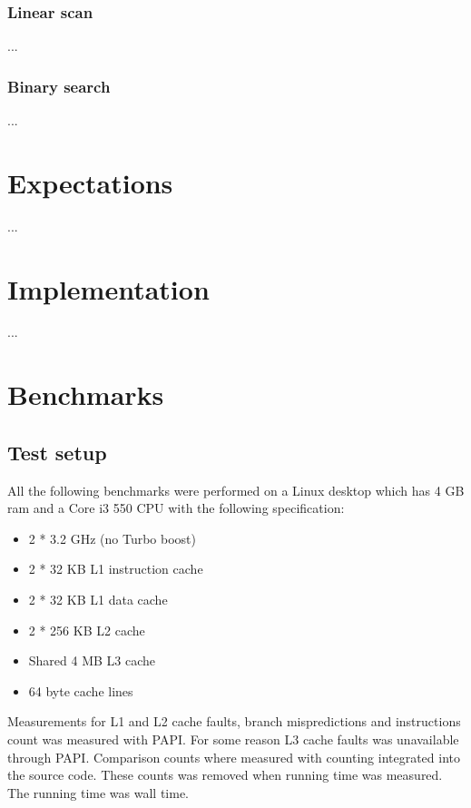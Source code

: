 \documentclass[a4paper]{article}
\begin{document}
\subsubsection{Linear scan}

...

\subsubsection{Binary search}

...

\section{Expectations}

...

\section{Implementation}

...


\section{Benchmarks}

\subsection{Test setup}

All the following benchmarks were performed on a Linux desktop which has 4 GB ram and a Core i3 550 CPU with the following specification:

\begin{itemize}
\item 2 * 3.2 GHz (no Turbo boost)
\item 2 * 32 KB L1 instruction cache
\item 2 * 32 KB L1 data cache
\item 2 * 256 KB L2 cache
\item Shared 4 MB L3 cache
\item 64 byte cache lines
\end{itemize}

Measurements for L1 and L2 cache faults, branch mispredictions and instructions count was measured with PAPI. For some reason L3 cache faults was unavailable through PAPI. Comparison counts where measured with counting integrated into the source code. These counts was removed when running time was measured. The running time was wall time.
\end{document}

